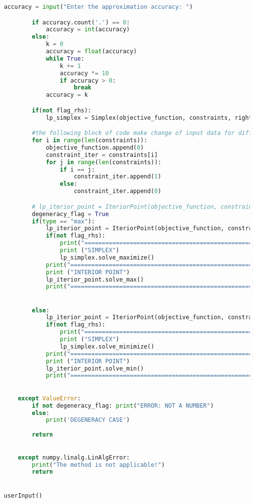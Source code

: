 \documentclass[12pt, legalpaper]{exam}
\begin{document}
\begin{lstlisting}[language=Python, caption=Программа на Python, label=lst:python-code]
        accuracy = input("Enter the approximation accuracy: ")

        if accuracy.count('.') == 0: 
            accuracy = int(accuracy)
        else:
            k = 0
            accuracy = float(accuracy)
            while True:
                k += 1
                accuracy *= 10
                if accuracy > 0:
                    break
            accuracy = k

        if(not flag_rhs):
            lp_simplex = Simplex(objective_function, constraints, right_hand_side, accuracy)

        #the following block of code make change of input data for different methods
        for i in range(len(constraints)):
            objective_function.append(0)
            constraint_iter = constraints[i]
            for j in range(len(constraints)):
                if i == j:
                    constraint_iter.append(1)
                else:
                    constraint_iter.append(0)

        # lp_iterior_point = IteriorPoint(objective_function, constraints, right_hand_side, accuracy, n)
        degeneracy_flag = True
        if(type == "max"):
            lp_iterior_point = IteriorPoint(objective_function, constraints, right_hand_side, accuracy, n, True)
            if(not flag_rhs):
                print("===============================================================")
                print ("SIMPLEX")
                lp_simplex.solve_maximize()
            print("===============================================================")
            print ("INTERIOR POINT")
            lp_iterior_point.solve_max()
            print("===============================================================")


        else:
            lp_iterior_point = IteriorPoint(objective_function, constraints, right_hand_side, accuracy, n, False)
            if(not flag_rhs):
                print("===============================================================")
                print ("SIMPLEX")
                lp_simplex.solve_minimize()
            print("===============================================================")
            print ("INTERIOR POINT")
            lp_iterior_point.solve_min()
            print("===============================================================")
        

    except ValueError:
        if not degeneracy_flag: print("ERROR: NOT A NUMBER")
        else: 
            print('DEGENERACY CASE')
            
        return
    

    except numpy.linalg.LinAlgError:
        print("The method is not applicable!")
        return


userInput()


\end{lstlisting}
\end{document}
